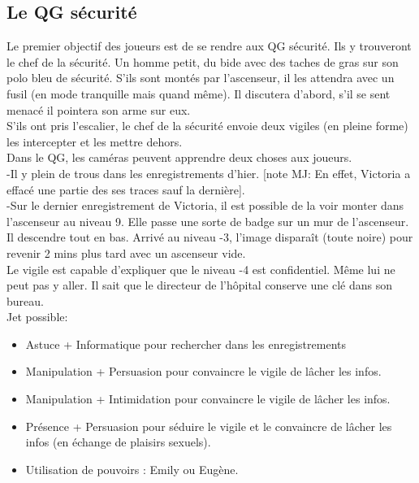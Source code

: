 \documentclass[oneside,12pt]{book}
\begin{document}
\begin{flushleft}
\section{Le QG sécurité}
Le premier objectif des joueurs est de se rendre aux QG sécurité. Ils y trouveront le chef de la sécurité. Un homme petit, du bide avec des taches de gras sur son polo bleu de sécurité. S'ils sont montés par l'ascenseur, il les attendra avec un fusil (en mode tranquille mais quand même). Il discutera d'abord, s'il se sent menacé il pointera son arme sur eux. \\ S'ils ont pris l'escalier, le chef de la sécurité envoie deux vigiles (en pleine forme) les intercepter et les mettre dehors.\\


\vspace{0.5cm}
Dans le QG, les caméras peuvent apprendre deux choses aux joueurs.\\
-Il y plein de trous dans les enregistrements d'hier. [note MJ: En effet, Victoria a effacé une partie des ses traces sauf la dernière].\\
-Sur le dernier enregistrement de Victoria, il est possible de la voir monter dans l'ascenseur au niveau 9. Elle passe une sorte de badge sur un mur de l'ascenseur. Il descendre tout en bas. Arrivé au niveau -3, l'image disparaît (toute noire) pour revenir 2 mins plus tard avec un ascenseur vide. \\


\vspace{0.5cm}
Le vigile est capable d'expliquer que le niveau -4 est confidentiel. Même lui ne peut pas y aller. Il sait que le directeur de l'hôpital conserve une clé dans son bureau.\\
Jet possible: 

\begin{itemize}
\item Astuce + Informatique pour rechercher dans les enregistrements 
\item Manipulation + Persuasion pour convaincre le vigile de lâcher les infos.
\item Manipulation + Intimidation pour convaincre le vigile de lâcher les infos.
\item Présence + Persuasion pour séduire le vigile et le convaincre de lâcher les infos (en échange de plaisirs sexuels).
\item Utilisation de pouvoirs : Emily ou Eugène.
\end{itemize}


\end{flushleft}
\end{document}
